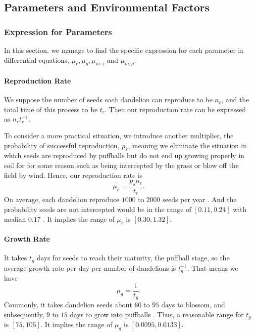 \documentclass[12pt]{article}
\begin{document}
\subsection{Parameters and Environmental Factors}
\subsubsection{Expression for Parameters}
In this section, we manage to find the specific expression for each parameter in differential equations, \(\mu_r,\mu_g,\mu_{m,s}\) and \(\mu_{m,p}\).

\paragraph{Reproduction Rate}
We suppose the number of seeds each dandelion can reproduce to be \(n_r\), and the total time of this process to be \(t_r\). Then our reproduction rate can be expressed as \(n_r t_r^{-1}\).

To consider a more practical situation, we introduce another multiplier, the probability of successful reproduction, \(p_s\), meaning we eliminate the situation in which seeds are reproduced by puffballs but do not end up growing properly in soil for for some reason such as being intercepted by the grass or blow off the field by wind. Hence, our reproduction rate is 
\begin{equation}
    \mu_r=\frac{p_s n_r}{t_r}.
\end{equation}
On average, each dandelion reproduce \(1000\) to \(2000\) seeds per year \cite{kershaw_getting_nodate}. And the probability seeds are not intercepted would be in the range of \([0.11, 0.24]\) with median \(0.17\) \cite{doisy_weed_2014}. It implies the range of \(\mu_r\) is \([0.30, 1.32]\).

\paragraph{Growth Rate}
It takes $t_g$ days for seeds to reach their maturity, the puffball stage, so the average growth rate per day per number of dandelions is \(t_g^{-1}\). That means we have
\begin{equation}
    \mu_g=\frac{1}{t_g}.
\end{equation}
Commonly, it takes dandelion seeds about \(60\) to \(95\) days to blossom, and subsequently, \(9\) to \(15\) days to grow into puffballs \cite{eve_how_2023}\cite{maria_its_nodate}. Thus, a reasonable range for $t_g$ is $ \left[75,105\right]$. It implies the range of $\mu_g$ is $\left[0.0095,0.0133\right]$.
\end{document}
